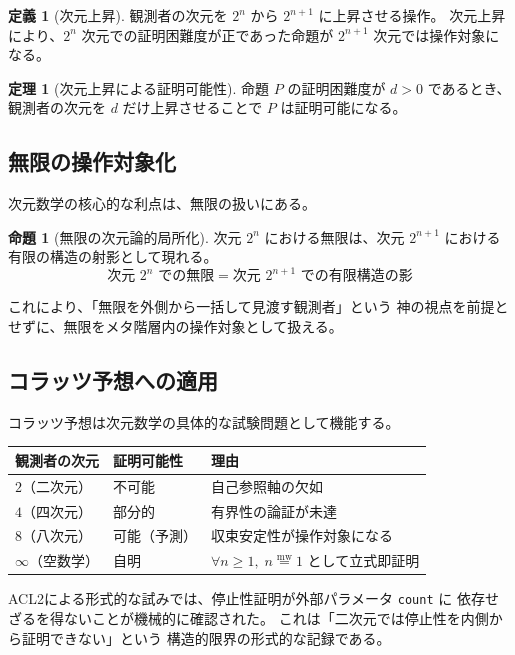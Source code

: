 \documentclass[11pt,a4paper]{article}
\newcommand{\mweq}{\mathrel{\overset{\mathrm{mw}}{=}}}
\theoremstyle{definition}
\newtheorem{definition}{定義}[section]
\newtheorem{theorem}{定理}[section]
\newtheorem{proposition}{命題}[section]
\begin{document}
\begin{definition}[次元上昇]
観測者の次元を $2^n$ から $2^{n+1}$ に上昇させる操作。
次元上昇により、$2^n$ 次元での証明困難度が正であった命題が
$2^{n+1}$ 次元では操作対象になる。
\end{definition}

\begin{theorem}[次元上昇による証明可能性]
命題 $P$ の証明困難度が $d > 0$ であるとき、
観測者の次元を $d$ だけ上昇させることで $P$ は証明可能になる。
\end{theorem}

\subsection{無限の操作対象化}

次元数学の核心的な利点は、無限の扱いにある。

\begin{proposition}[無限の次元論的局所化]
次元 $2^n$ における無限は、次元 $2^{n+1}$ における有限の構造の射影として現れる。
\[
\text{次元 } 2^n \text{ での無限} = \text{次元 } 2^{n+1} \text{ での有限構造の影}
\]
\end{proposition}

これにより、「無限を外側から一括して見渡す観測者」という
神の視点を前提とせずに、無限をメタ階層内の操作対象として扱える。

\subsection{コラッツ予想への適用}

コラッツ予想は次元数学の具体的な試験問題として機能する。

\begin{center}
\begin{tabular}{lll}
\toprule
観測者の次元 & 証明可能性 & 理由 \\
\midrule
$2$（二次元） & 不可能 & 自己参照軸の欠如 \\
$4$（四次元） & 部分的 & 有界性の論証が未達 \\
$8$（八次元） & 可能（予測） & 収束安定性が操作対象になる \\
$\infty$（空数学） & 自明 & $\forall n \geq 1,\; n \mweq 1$ として立式即証明 \\
\bottomrule
\end{tabular}
\end{center}

ACL2による形式的な試みでは、停止性証明が外部パラメータ \texttt{count} に
依存せざるを得ないことが機械的に確認された。
これは「二次元では停止性を内側から証明できない」という
構造的限界の形式的な記録である。
\end{document}
